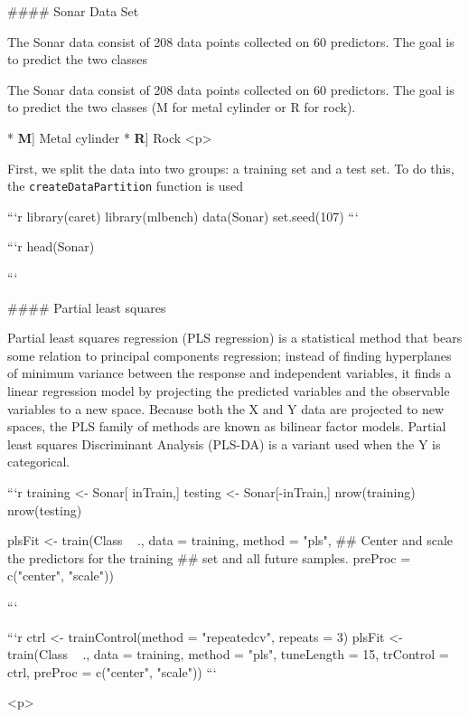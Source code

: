 

#### Sonar Data Set

The Sonar data consist of 208 data points collected on 60 predictors. 
The goal is to predict the two classes

The Sonar data consist of 208 data points collected on 60 predictors. 
The goal is to predict the two classes (M for metal cylinder or R for rock).

* \textbf{M}] Metal cylinder 
* \textbf{R}] Rock
<p>

First, we split the data into two groups: a training set and a test set. 
To do this, the \texttt{createDataPartition} function is used




```{r}
library(caret)
library(mlbench)
data(Sonar)
set.seed(107)
```


```{r}
head(Sonar)

```

#### Partial least squares

Partial least squares regression (PLS regression) is a statistical method that bears some relation to principal components regression; instead of finding hyperplanes of minimum variance between the response and independent variables, it finds a linear regression model by projecting the predicted variables and the observable variables to a new space. Because both the X and Y data are projected to new spaces, the PLS family of methods are known as bilinear factor models. Partial least squares Discriminant Analysis (PLS-DA) is a variant used when the Y is categorical.


```{r}
training <- Sonar[ inTrain,]
testing <- Sonar[-inTrain,]
nrow(training)
nrow(testing)

plsFit <- train(Class ~ .,
 data = training,
 method = "pls",
 ## Center and scale the predictors for the training
 ## set and all future samples.
 preProc = c("center", "scale"))

```



```{r}
ctrl <- trainControl(method = "repeatedcv", repeats = 3)
plsFit <- train(Class ~ .,
	data = training,
	method = "pls",
	tuneLength = 15,
	trControl = ctrl,
	preProc = c("center", "scale"))
```


<p>
